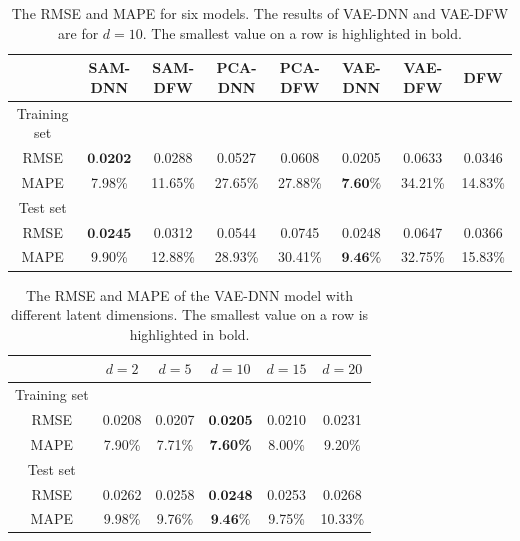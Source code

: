 \documentclass[11pt,a4paper]{article}
\theoremstyle{remark}
\begin{document}
\begin{table}[htbp!]
	\centering
	\begin{tabular}{cccccccc}
		\hline
		& SAM-DNN      & SAM-DFW &PCA-DNN          & PCA-DFW&VAE-DNN &VAE-DFW& DFW \\
		\hline
		Training set&         &          &            &             &          &        & \\
		RMSE         & $\textbf{0.0202}$& 0.0288   &0.0527        & 0.0608 &0.0205  & 0.0633 & 0.0346 \\
		MAPE         & 7.98\%  & 11.65\% &27.65\%    & 27.88\% &$\textbf{7.60\%}$ & 34.21\%  & 14.83\%\\
		
		\hline
		Test set  &        &       &         &             &             &          &     \\
		RMSE         & $\textbf{0.0245}$ & 0.0312    &0.0544    & 0.0745&0.0248      &0.0647 &   0.0366\\
		MAPE         & 9.90\% & 12.88\%    &28.93\%    &30.41\%&$\textbf{9.46\%}$     &32.75\%  & 15.83\%\\
		
		\hline
	\end{tabular}%
	\caption{The RMSE and MAPE for six models. The results of VAE-DNN and VAE-DFW are for $d=10$. The smallest value on a row is highlighted in bold. }
	\label{tab:err}%
\end{table}%

\begin{table}[htbp!]
	\centering
	\begin{tabular}{cccccc}
		\hline
		& $d=2$   & $d=5$  & $d=10$ & $d=15$ & $d=20$ \\
		\hline
		Training set&         &          &            &             &          \\
		RMSE&  0.0208    &   0.0207    &  $\textbf{0.0205}$          &  0.0210        & 0.0231         \\
		MAPE&7.90\%     &  7.71\%     &    \textbf{7.60\%}        &  8.00\%           &  9.20\%        \\
		\hline
		Test set&         &          &            &             &          \\
		RMSE&  0.0262      & 0.0258     &$ \textbf{0.0248} $          &  0.0253           &  0.0268        \\
		MAPE&  9.98\%       &  9.76\%     &  $\textbf{9.46\%} $         &   9.75\%          &  10.33\%        \\
		\hline
	\end{tabular}%
	\caption{The RMSE and MAPE of the VAE-DNN model with different latent dimensions. The smallest value on a row is highlighted in bold.}
	\label{tab:VAE-d}%
\end{table}%
\end{document}
